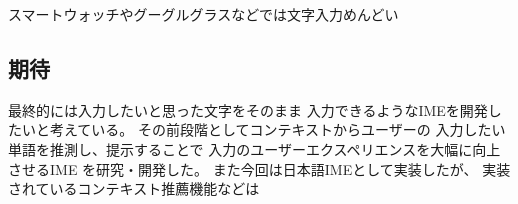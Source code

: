 スマートウォッチやグーグルグラスなどでは文字入力めんどい

\subsection{期待}
最終的には入力したいと思った文字をそのまま
入力できるようなIMEを開発したいと考えている。
その前段階としてコンテキストからユーザーの
入力したい単語を推測し、提示することで
入力のユーザーエクスペリエンスを大幅に向上させるIME
を研究・開発した。
また今回は日本語IMEとして実装したが、
実装されているコンテキスト推薦機能などは
